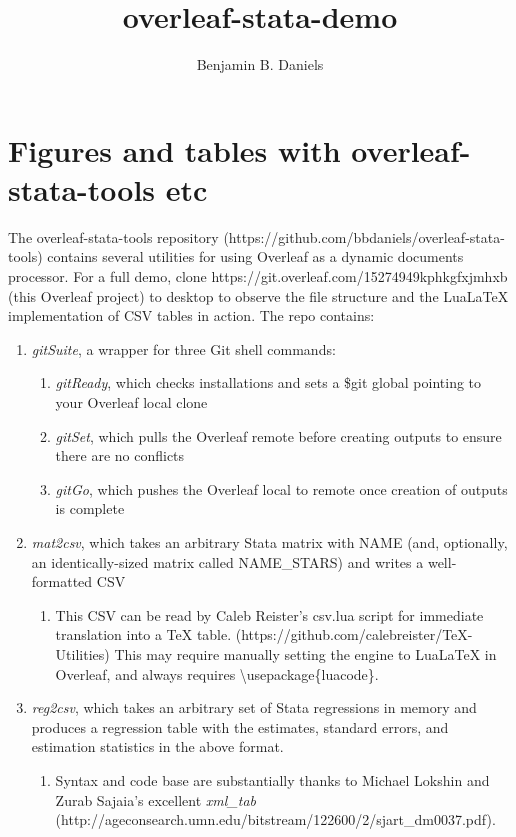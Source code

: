 \documentclass[a4paper]{article}
\title{overleaf-stata-demo}
\author{Benjamin B. Daniels}
\begin{document}
\maketitle

\section{Figures and tables with overleaf-stata-tools etc}

The overleaf-stata-tools repository (https://github.com/bbdaniels/overleaf-stata-tools) contains several utilities for using Overleaf as a dynamic documents processor. For a full demo, clone https://git.overleaf.com/15274949kphkgfxjmhxb (this Overleaf project) to desktop to observe the file structure and the LuaLaTeX implementation of CSV tables in action. The repo contains:

\begin{enumerate}
\item {\it gitSuite}, a wrapper for three Git shell commands:
	\begin{enumerate}
	\item {\it gitReady}, which checks installations and sets a \${git} global pointing to your Overleaf local clone
    \item {\it gitSet}, which pulls the Overleaf remote before creating outputs to ensure there are no conflicts
    \item {\it gitGo}, which pushes the Overleaf local to remote once creation of outputs is complete
    \end{enumerate}
\item {\it mat2csv}, which takes an arbitrary Stata matrix with NAME (and, optionally, an identically-sized matrix called NAME\_STARS) and writes a well-formatted CSV
	\begin{enumerate}
	\item This CSV can be read by Caleb Reister's csv.lua script for immediate translation into a TeX table. (https://github.com/calebreister/TeX-Utilities) This may require manually setting the engine to LuaLaTeX in Overleaf, and always requires \textbackslash usepackage\{luacode\}.
    \end{enumerate}
\item {\it reg2csv}, which takes an arbitrary set of Stata regressions in memory and produces a regression table with the estimates, standard errors, and estimation statistics in the above format.
	\begin{enumerate}
	\item Syntax and code base are substantially thanks to Michael Lokshin and Zurab Sajaia's excellent {\it xml\_tab} (http://ageconsearch.umn.edu/bitstream/122600/2/sjart\_dm0037.pdf).
    \end{enumerate}

\end{enumerate}
\end{document}
